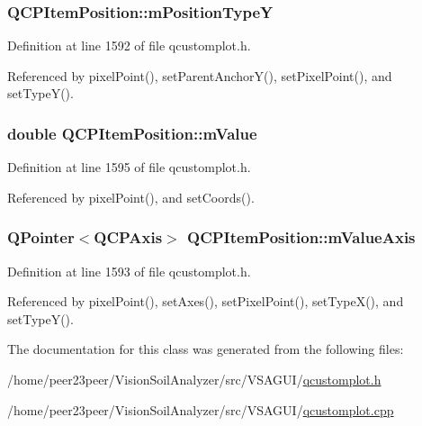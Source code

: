 \subsubsection[{m\+Position\+Type\+Y}]{ Q\+C\+P\+Item\+Position\+::m\+Position\+Type\+Y\hspace{0.3cm}{\ttfamily [protected]}}\label{class_q_c_p_item_position_a47c96c0ef4380e1af4aaa7c2265c260b}


Definition at line 1592 of file qcustomplot.\+h.



Referenced by pixel\+Point(), set\+Parent\+Anchor\+Y(), set\+Pixel\+Point(), and set\+Type\+Y().

\hypertarget{class_q_c_p_item_position_a67bf5df69f587d53731724a7d61c6c3f}{}
\subsubsection[{m\+Value}]{\setlength{\rightskip}{0pt plus 5cm}double Q\+C\+P\+Item\+Position\+::m\+Value\hspace{0.3cm}{\ttfamily [protected]}}\label{class_q_c_p_item_position_a67bf5df69f587d53731724a7d61c6c3f}


Definition at line 1595 of file qcustomplot.\+h.



Referenced by pixel\+Point(), and set\+Coords().

\hypertarget{class_q_c_p_item_position_a505dc2da24ba274452c1c817fcaba011}{}
\subsubsection[{m\+Value\+Axis}]{\setlength{\rightskip}{0pt plus 5cm}Q\+Pointer$<${\bf Q\+C\+P\+Axis}$>$ Q\+C\+P\+Item\+Position\+::m\+Value\+Axis\hspace{0.3cm}{\ttfamily [protected]}}\label{class_q_c_p_item_position_a505dc2da24ba274452c1c817fcaba011}


Definition at line 1593 of file qcustomplot.\+h.



Referenced by pixel\+Point(), set\+Axes(), set\+Pixel\+Point(), set\+Type\+X(), and set\+Type\+Y().



The documentation for this class was generated from the following files\+:\begin{DoxyCompactItemize}
\item 
/home/peer23peer/\+Vision\+Soil\+Analyzer/src/\+V\+S\+A\+G\+U\+I/\hyperlink{qcustomplot_8h}{qcustomplot.\+h}\item 
/home/peer23peer/\+Vision\+Soil\+Analyzer/src/\+V\+S\+A\+G\+U\+I/\hyperlink{qcustomplot_8cpp}{qcustomplot.\+cpp}\end{DoxyCompactItemize}
